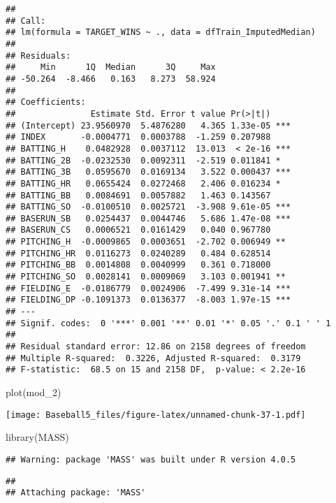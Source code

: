 \documentclass[
]{article}
\newenvironment{Shaded}{\begin{snugshade}}{\end{snugshade}}
\newcommand{\FunctionTok}[1]{\textcolor[rgb]{0.00,0.00,0.00}{#1}}
\newcommand{\NormalTok}[1]{#1}
\begin{document}
\begin{verbatim}
## 
## Call:
## lm(formula = TARGET_WINS ~ ., data = dfTrain_ImputedMedian)
## 
## Residuals:
##     Min      1Q  Median      3Q     Max 
## -50.264  -8.466   0.163   8.273  58.924 
## 
## Coefficients:
##               Estimate Std. Error t value Pr(>|t|)    
## (Intercept) 23.9560970  5.4876280   4.365 1.33e-05 ***
## INDEX       -0.0004771  0.0003788  -1.259 0.207988    
## BATTING_H    0.0482928  0.0037112  13.013  < 2e-16 ***
## BATTING_2B  -0.0232530  0.0092311  -2.519 0.011841 *  
## BATTING_3B   0.0595670  0.0169134   3.522 0.000437 ***
## BATTING_HR   0.0655424  0.0272468   2.406 0.016234 *  
## BATTING_BB   0.0084691  0.0057882   1.463 0.143567    
## BATTING_SO  -0.0100510  0.0025721  -3.908 9.61e-05 ***
## BASERUN_SB   0.0254437  0.0044746   5.686 1.47e-08 ***
## BASERUN_CS   0.0006521  0.0161429   0.040 0.967780    
## PITCHING_H  -0.0009865  0.0003651  -2.702 0.006949 ** 
## PITCHING_HR  0.0116273  0.0240289   0.484 0.628514    
## PITCHING_BB  0.0014808  0.0040999   0.361 0.718000    
## PITCHING_SO  0.0028141  0.0009069   3.103 0.001941 ** 
## FIELDING_E  -0.0186779  0.0024906  -7.499 9.31e-14 ***
## FIELDING_DP -0.1091373  0.0136377  -8.003 1.97e-15 ***
## ---
## Signif. codes:  0 '***' 0.001 '**' 0.01 '*' 0.05 '.' 0.1 ' ' 1
## 
## Residual standard error: 12.86 on 2158 degrees of freedom
## Multiple R-squared:  0.3226, Adjusted R-squared:  0.3179 
## F-statistic:  68.5 on 15 and 2158 DF,  p-value: < 2.2e-16
\end{verbatim}

\begin{Shaded}
\begin{Highlighting}[]
\FunctionTok{plot}\NormalTok{(mod\_2)}
\end{Highlighting}
\end{Shaded}

\texttt{[image: Baseball5\_files/figure-latex/unnamed-chunk-37-1.pdf]}

\begin{Shaded}
\begin{Highlighting}[]
\FunctionTok{library}\NormalTok{(MASS)}
\end{Highlighting}
\end{Shaded}

\begin{verbatim}
## Warning: package 'MASS' was built under R version 4.0.5
\end{verbatim}

\begin{verbatim}
## 
## Attaching package: 'MASS'
\end{verbatim}
\end{document}
